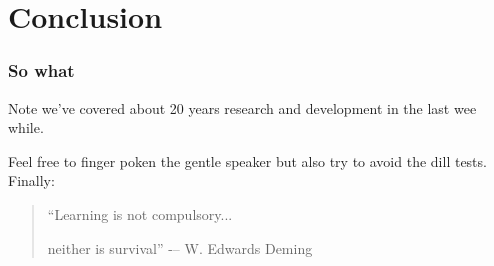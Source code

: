 \documentclass{beamer}
\begin{document}
\section{Conclusion}
\begin{frame}\frametitle{So what}
Note we've covered about 20 years research and development in
the last wee while.\pause

Feel free to finger poken the gentle speaker but also try to avoid the
dill tests.  \vfill \pause Finally:
\begin{quote}
“Learning is not compulsory...

\pause
neither is survival” -– W. Edwards Deming
\end{quote}
\end{frame}
\end{document}
